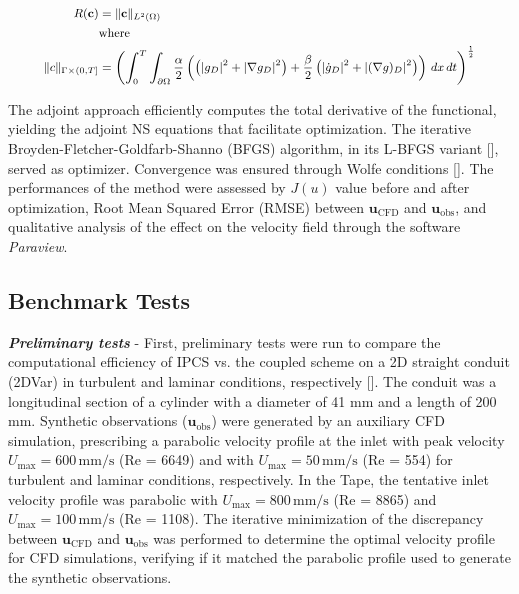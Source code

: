 \begin{equation}
\small
    \begin{aligned}
        R(\mathbf{c}) &= \| \mathbf{c} \|_{L^2(\Omega)} \\
        &\text{where} \\
        \small
        \|c\|_{\Gamma \times (0, T]} &= \left( \int_0^T \int_{\partial \Omega} \frac{\alpha}{2} \left( \left(|g_D|^2 + |\nabla g_D|^2 \right) + \frac{\beta}{2} \left( |\dot{g}_D|^2 +  |(\nabla g)_D|^2 \right) \right) \, dx \, dt \right)^{\frac{1}{2}}
    \end{aligned}
    \label{eq:11} 
\end{equation}

The adjoint approach efficiently computes the total derivative of the functional, yielding the adjoint NS equations that facilitate optimization. The iterative Broyden-Fletcher-Goldfarb-Shanno (BFGS) algorithm, in its L-BFGS variant [\cite{Liu1989}], served as optimizer. Convergence was ensured through Wolfe conditions [\cite{Nocedal2006}]. %
The performances of the method were assessed by   $J(u)$ value before and after optimization, Root Mean Squared Error (RMSE) between \( \mathbf{u}_{\text{CFD}} \) and \( \mathbf{u}_{\text{obs}} \), and qualitative analysis of the effect on the velocity field through the software \emph{Paraview}.

\subsection*{Benchmark Tests}
\label{sec:bench}
\textbf{\textit{Preliminary tests}} - First, preliminary tests were run to compare the computational efficiency of IPCS vs. the coupled scheme on a 2D straight conduit (2DVar) in turbulent and laminar conditions, respectively [\cite{Hale1955}]. The conduit was a longitudinal section of a cylinder with a diameter of 41 mm and a length of 200 mm. Synthetic observations (\( \mathbf{u}_{\text{obs}} \)) were generated by an auxiliary CFD simulation, prescribing a parabolic velocity profile at the inlet with peak velocity \( U_{\text{max}} = 600 \, \text{mm/s} \) (Re = 6649) and with \( U_{\text{max}} = 50 \, \text{mm/s} \) (Re = 554) for turbulent and laminar conditions, respectively.
In the Tape, the tentative inlet velocity profile was parabolic with \( U_{\text{max}} = 800 \, \text{mm/s} \) (Re = 8865) and \( U_{\text{max}} = 100 \, \text{mm/s} \) (Re = 1108).
The iterative minimization of the discrepancy between \( \mathbf{u}_{\text{CFD}} \) and \( \mathbf{u}_{\text{obs}} \) was performed to determine the optimal velocity profile for CFD simulations, verifying if it matched the parabolic profile used to generate the synthetic observations.\\

